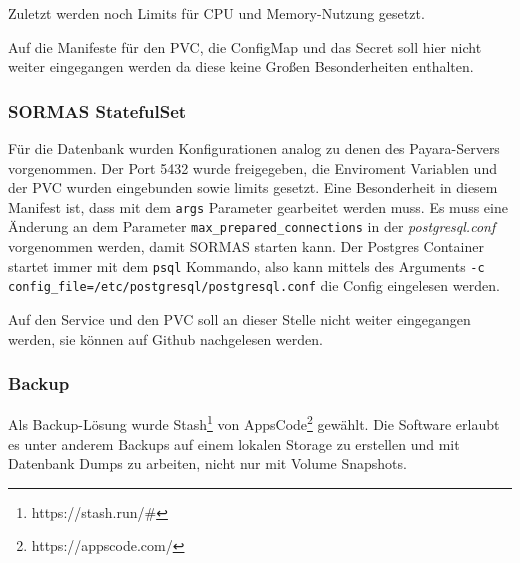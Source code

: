 Zuletzt werden noch Limits für \ac{CPU} und Memory-Nutzung gesetzt. 

Auf die Manifeste für den \ac{PVC}, die ConfigMap und das Secret soll hier nicht weiter eingegangen werden da diese keine Großen Besonderheiten enthalten. 

\hfill \newline
\subsubsection{SORMAS StatefulSet}
Für die Datenbank wurden Konfigurationen analog zu denen des Payara-Servers vorgenommen.
Der Port 5432 wurde freigegeben, die Enviroment Variablen und der \ac{PVC} wurden eingebunden sowie limits gesetzt.
Eine Besonderheit in diesem Manifest ist, dass mit dem \texttt{args} Parameter gearbeitet werden muss. 
Es muss eine Änderung an dem Parameter \texttt{max\_prepared\_connections} in der \textit{postgresql.conf} vorgenommen werden, damit \ac{SORMAS} starten kann. 
Der Postgres Container startet immer mit dem \texttt{psql} Kommando, also kann mittels des Arguments \texttt{-c config\_file=/etc/postgresql/postgresql.conf} die Config eingelesen werden.

Auf den Service und den \ac{PVC} soll an dieser Stelle nicht weiter eingegangen werden, sie können auf Github nachgelesen werden. 


\hfill \newline
\subsubsection{Backup}
Als Backup-Lösung wurde Stash\footnote{https://stash.run/\#} von AppsCode\footnote{https://appscode.com/} gewählt.
Die Software erlaubt es unter anderem Backups auf einem lokalen Storage zu erstellen und mit Datenbank Dumps zu arbeiten, nicht nur mit Volume Snapshots.

